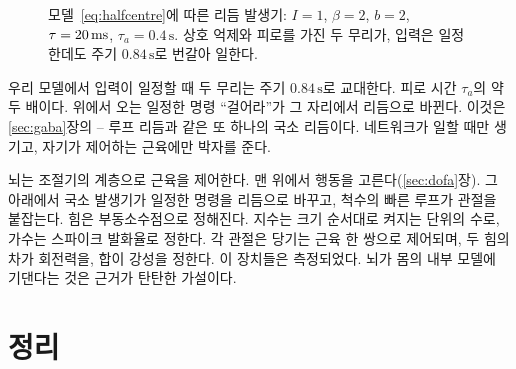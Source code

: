 \begin{figure}[t]
\centering
{}
\caption{모델~\eqref{eq:halfcentre}에 따른 리듬 발생기: $I=1$, $\beta=2$, $b=2$, $\tau=20\,\text{ms}$, $\tau_a=0.4\,\text{s}$. 상호 억제와 피로를 가진 두 무리가, 입력은 일정한데도 주기 $0.84\,\text{s}$로 번갈아 일한다.}
\label{fig:halfcentre}
\end{figure}

우리 모델에서 입력이 일정할 때 두 무리는 주기 $0.84\,\text{s}$로 교대한다. 피로 시간 $\tau_a$의 약 두 배이다. 위에서 오는 일정한 명령 “걸어라”가 그 자리에서 리듬으로 바뀐다. 이것은 \ref{sec:gaba}장의 -- 루프 리듬과 같은 또 하나의 국소 리듬이다. 네트워크가 일할 때만 생기고, 자기가 제어하는 근육에만 박자를 준다.

\begin{keyblock}
\begin{proposition}[기계의 출력]
\label{prop:muscles}
뇌는 조절기의 계층으로 근육을 제어한다. 맨 위에서 행동을 고른다(\ref{sec:dofa}장). 그 아래에서 국소 발생기가 일정한 명령을 리듬으로 바꾸고, 척수의 빠른 루프가 관절을 붙잡는다. 힘은 부동소수점으로 정해진다. 지수는 크기 순서대로 켜지는 단위의 수로, 가수는 스파이크 발화율로 정한다. 각 관절은 당기는 근육 한 쌍으로 제어되며, 두 힘의 차가 회전력을, 합이 강성을 정한다. 이 장치들은 측정되었다. 뇌가 몸의 내부 모델에 기댄다는 것은 근거가 탄탄한 가설이다.
\end{proposition}
\end{keyblock}

\section{정리}

